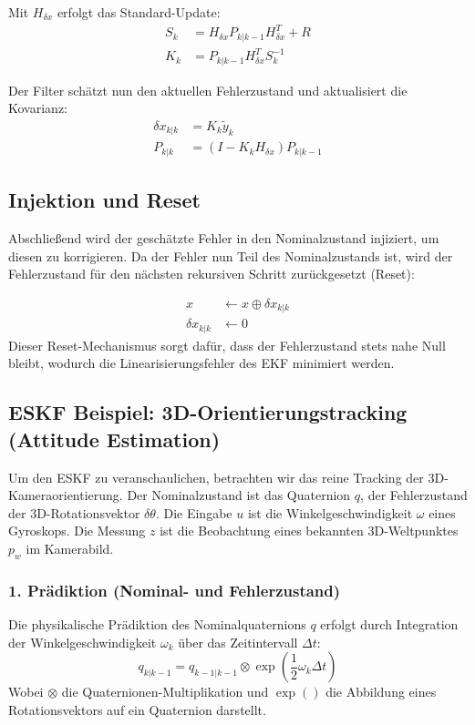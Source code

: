 \documentclass{article}
\begin{document}
Mit $H_{\delta x}$ erfolgt das Standard-Update:
\begin{align}
    S_k &= H_{\delta x} P_{k|k-1} H_{\delta x}^T + R \\
    K_k &= P_{k|k-1} H_{\delta x}^T S_k^{-1}
\end{align}

Der Filter schätzt nun den aktuellen Fehlerzustand und aktualisiert die Kovarianz:
\begin{align}
    \delta x_{k|k} &= K_k \tilde{y}_k \\
    P_{k|k} &= (I - K_k H_{\delta x}) P_{k|k-1}
\end{align}




\subsection{Injektion und Reset}
Abschließend wird der geschätzte Fehler in den Nominalzustand injiziert, um diesen zu korrigieren. Da der Fehler nun Teil des Nominalzustands ist, wird der Fehlerzustand für den nächsten rekursiven Schritt zurückgesetzt (Reset):

\begin{align}
    x &\leftarrow x \oplus \delta x_{k|k} \\
    \delta x_{k|k} &\leftarrow 0
\end{align}
Dieser Reset-Mechanismus sorgt dafür, dass der Fehlerzustand stets nahe Null bleibt, wodurch die Linearisierungsfehler des EKF minimiert werden.




\subsection{ESKF Beispiel: 3D-Orientierungstracking (Attitude Estimation)}
\label{sec:eskf_example}

Um den ESKF zu veranschaulichen, betrachten wir das reine Tracking der 3D-Kameraorientierung. Der Nominalzustand ist das Quaternion $q$, der Fehlerzustand der 3D-Rotationsvektor $\delta \theta$. Die Eingabe $u$ ist die Winkelgeschwindigkeit $\omega$ eines Gyroskops. Die Messung $z$ ist die Beobachtung eines bekannten 3D-Weltpunktes $p_w$ im Kamerabild.



\subsubsection{1. Prädiktion (Nominal- und Fehlerzustand)}
Die physikalische Prädiktion des Nominalquaternions $q$ erfolgt durch Integration der Winkelgeschwindigkeit $\omega_k$ über das Zeitintervall $\Delta t$:
\begin{equation}
    q_{k|k-1} = q_{k-1|k-1} \otimes \exp\left(\frac{1}{2} \omega_k \Delta t\right)
\end{equation}
Wobei $\otimes$ die Quaternionen-Multiplikation und $\exp()$ die Abbildung eines Rotationsvektors auf ein Quaternion darstellt.
\end{document}
